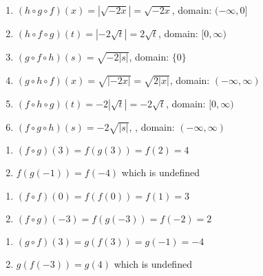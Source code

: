 \documentclass{ximera}
\begin{document}
\begin{enumerate}
\setcounter{enumi}{\value{HW}}

\item $(h\circ g \circ f)(x)= |\sqrt{-2x}|= \sqrt{-2x}$, domain: $(-\infty, 0]$ 

\item $(h\circ f \circ g)(t) = |-2\sqrt{t}|= 2\sqrt{t}$, domain: $[0,\infty)$

\item $(g\circ f \circ h)(s) = \sqrt{-2|s|}$, domain:  $\{0\}$

\item $(g\circ h \circ f)(x) = \sqrt{|-2x|} = \sqrt{2|x|}$, domain: $(-\infty, \infty)$ 

\item $(f\circ h \circ g)(t) = -2|\sqrt{t}| = -2\sqrt{t}$, domain: $[0,\infty)$

\item $(f\circ g \circ h)(s) = -2\sqrt{|s|}$, , domain: $(-\infty,\infty)$

\setcounter{HW}{\value{enumi}}
\end{enumerate}

\begin{multicols}{2}
\begin{enumerate}
\setcounter{enumi}{\value{HW}}

\item $(f \circ g)(3)= f(g(3)) = f(2) = 4$
\item $f(g(-1)) = f(-4)$ which is undefined

\setcounter{HW}{\value{enumi}}
\end{enumerate}
\end{multicols}

\begin{multicols}{2}
\begin{enumerate}
\setcounter{enumi}{\value{HW}}

\item $(f \circ f)(0) = f(f(0)) = f(1) = 3$
\item $(f \circ g)(-3) = f(g(-3)) = f(-2) = 2$

\setcounter{HW}{\value{enumi}}
\end{enumerate}
\end{multicols}

\begin{multicols}{2}
\begin{enumerate}
\setcounter{enumi}{\value{HW}}

\item $(g \circ f)(3) = g(f(3)) = g(-1) = -4$
\item $g(f(-3)) = g(4)$ which is undefined

\setcounter{HW}{\value{enumi}}
\end{enumerate}
\end{multicols}
\end{document}
